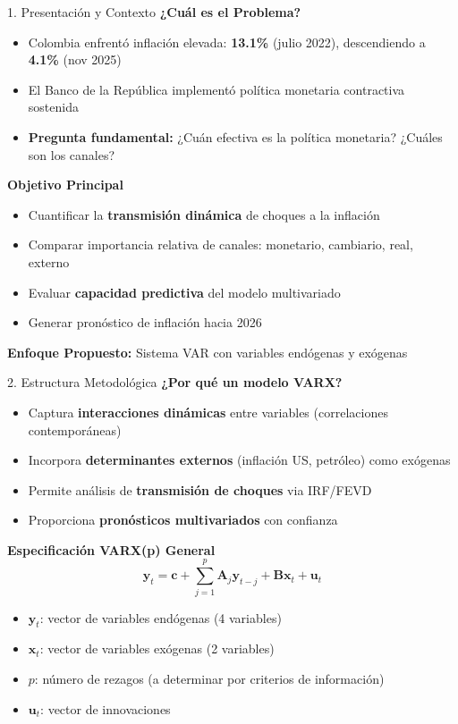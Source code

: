\documentclass[spanish, 11pt]{beamer}
\begin{document}
\begin{frame}{1. Presentación y Contexto}
\textbf{¿Cuál es el Problema?}
\begin{itemize}
  \item Colombia enfrentó inflación elevada: \textbf{13.1\%} (julio 2022), descendiendo a \textbf{4.1\%} (nov 2025)
  \item El Banco de la República implementó política monetaria contractiva sostenida
  \item \textbf{Pregunta fundamental:} ¿Cuán efectiva es la política monetaria? ¿Cuáles son los canales?
\end{itemize}

\vspace{0.3cm}
\textbf{Objetivo Principal}
\begin{itemize}
  \item Cuantificar la \textbf{transmisión dinámica} de choques a la inflación
  \item Comparar importancia relativa de canales: monetario, cambiario, real, externo
  \item Evaluar \textbf{capacidad predictiva} del modelo multivariado
  \item Generar pronóstico de inflación hacia 2026
\end{itemize}

\vspace{0.3cm}
\textbf{Enfoque Propuesto:} Sistema VAR con variables endógenas y exógenas
\end{frame}

\begin{frame}{2. Estructura Metodológica}
\textbf{¿Por qué un modelo VARX?}
\begin{itemize}
  \item Captura \textbf{interacciones dinámicas} entre variables (correlaciones contemporáneas)
  \item Incorpora \textbf{determinantes externos} (inflación US, petróleo) como exógenas
  \item Permite análisis de \textbf{transmisión de choques} via IRF/FEVD
  \item Proporciona \textbf{pronósticos multivariados} con confianza
\end{itemize}

\vspace{0.3cm}
\textbf{Especificación VARX(p) General}
\[
\mathbf{y}_t = \mathbf{c} + \sum_{j=1}^{p} \mathbf{A}_j \mathbf{y}_{t-j} + \mathbf{B} \mathbf{x}_t + \mathbf{u}_t
\]

\vspace{0.2cm}
\begin{itemize}
  \item $\mathbf{y}_t$: vector de variables endógenas (4 variables)
  \item $\mathbf{x}_t$: vector de variables exógenas (2 variables)
  \item $p$: número de rezagos (a determinar por criterios de información)
  \item $\mathbf{u}_t$: vector de innovaciones
\end{itemize}
\end{frame}
\end{document}
